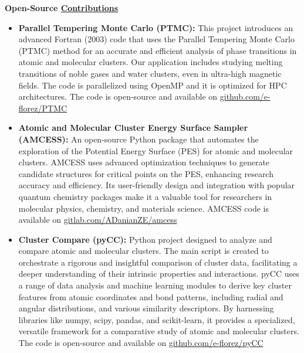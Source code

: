 {\bf\Large Open-Source \href{.}{Contributions}}

\begin{itemize}
    \small
    \item \textbf{Parallel Tempering Monte Carlo (PTMC):}
          This project introduces an advanced Fortran (2003) code that uses the Parallel Tempering Monte Carlo (PTMC) method for an accurate and efficient analysis of phase transitions in atomic and molecular clusters. Our application includes studying melting transitions of noble gases and water clusters, even in ultra-high magnetic fields. The code is parallelized using OpenMP and it is optimized for HPC architectures. The code is open-source and available on \href{https://github.com/e-florez/PTMC}{github.com/e-florez/PTMC}

    \item \textbf{Atomic and Molecular Cluster Energy Surface Sampler (AMCESS):}
          An open-source Python package that automates the exploration of the Potential Energy Surface (PES) for atomic and molecular clusters. AMCESS uses advanced optimization techniques to generate candidate structures for critical points on the PES, enhancing research accuracy and efficiency. Its user-friendly design and integration with popular quantum chemistry packages make it a valuable tool for researchers in molecular physics, chemistry, and materials science. AMCESS code is available on \href{https://gitlab.com/ADanianZE/amcess}{gitlab.com/ADanianZE/amcess}

    \item \textbf{Cluster Compare (pyCC):}
          Python project designed to analyze and compare atomic and molecular clusters. The main script is created to orchestrate a rigorous and insightful comparison of cluster data, facilitating a deeper understanding of their intrinsic properties and interactions. pyCC uses a range of data analysis and machine learning modules to derive key cluster features from atomic coordinates and bond patterns, including radial and angular distributions, and various similarity descriptors. By harnessing libraries like numpy, scipy, pandas, and scikit-learn, it provides a specialized, versatile framework for a comparative study of atomic and molecular clusters. The code is open-source and available on \href{https://github.com/e-florez/pyCC}{github.com/e-florez/pyCC}

\end{itemize}